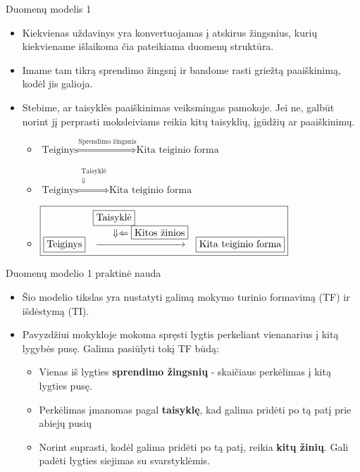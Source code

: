 \documentclass[xcolor={dvipsnames}]{beamer}
\begin{document}
\begin{frame}[fragile]{Duomenų modelis 1}
\begin{itemize}
\item<1-> Kiekvienas uždavinys yra konvertuojamas į atskirus žingsnius, kurių kiekviename išlaikoma čia pateikiama duomenų struktūra.
\item<2-> Imame tam tikrą sprendimo žingsnį ir bandome rasti griežtą paaiškinimą, kodėl jis galioja.
\item<3-> Stebime, ar taisyklės paaiškinimas veiksmingas pamokoje. Jei ne, galbūt norint jį perprasti moksleiviams reikia kitų taisyklių, įgūdžių ar paaiškinimų.
      \begin{itemize}
	\item<4-> $\boxed{\boxed{\text{Teiginys}} \stackrel{\boxed{\text{Sprendimo žingsnis}}}{\Rightarrow} \boxed{\text{Kita teiginio forma}}}$
	\item<5-> $\boxed{\boxed{\text{Teiginys}} \stackrel{\begin{array}{c}\boxed{\text{Taisyklė}}\\ \Downarrow\end{array}}{\Longrightarrow} \boxed{\text{Kita teiginio forma}}}$
	\item<6-> $\boxed{\boxed{\text{Teiginys}} \stackrel{\begin{array}{l}\boxed{\text{Taisyklė}}\\ \qquad\Downarrow\Leftarrow\boxed{\text{Kitos žinios}}\end{array}}{\xrightarrow{\hspace*{3cm}}} \boxed{\text{Kita teiginio forma}}}$
      \end{itemize}
\end{itemize}
\end{frame}

\begin{frame}[fragile]{Duomenų modelio 1 praktinė nauda}
\begin{itemize}
\item<1->  Šio modelio tikslas yra nustatyti galimą mokymo turinio formavimą (TF) ir išdėstymą (TI).
\item<2->  Pavyzdžiui mokykloje mokoma spręsti lygtis perkeliant vienanarius į kitą lygybės pusę. Galima pasiūlyti tokį TF būdą:
\begin{itemize}
\item Vienas iš lygties \textbf{sprendimo žingsnių} - skaičiaus perkėlimas į kitą lygties pusę.
\item Perkėlimas įmanomas pagal \textbf{taisyklę}, kad galima pridėti po tą patį prie abiejų pusių
\item Norint suprasti, kodėl galima pridėti po tą patį, reikia \textbf{kitų žinių}. Gali padėti lygties siejimas su svarstyklėmis.
\end{itemize}
\end{itemize}
\end{frame}
\end{document}
